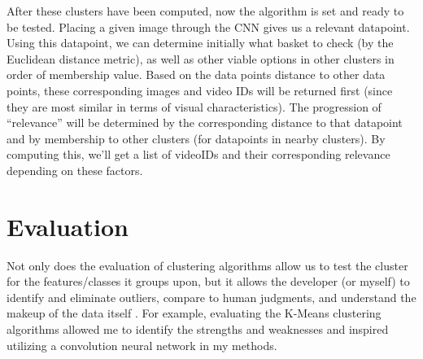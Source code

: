 \documentclass[10pt,twocolumn]{article}
\begin{document}
	

After these clusters have been computed, now the algorithm is set and ready to be tested. Placing a given image through the CNN gives us a relevant datapoint. Using this datapoint, we can determine initially what basket to check (by the Euclidean distance metric), as well as other viable options in other clusters in order of membership value. Based on the data points distance to other data points, these corresponding images and video IDs will be returned first (since they are most similar in terms of visual characteristics). The progression of “relevance” will be determined by the corresponding distance to that datapoint and by membership to other clusters (for datapoints in nearby clusters). By computing this, we’ll get a list of videoIDs and their corresponding relevance depending on these factors. 

\section{Evaluation}

Not only does the evaluation of clustering algorithms allow us to test the cluster for the features/classes it groups upon, but it allows the developer (or myself) to identify and eliminate outliers, compare to human judgments, and understand the makeup of the data itself \cite{Lavrenko2014}. For example, evaluating the K-Means clustering algorithms allowed me to identify the strengths and weaknesses and inspired utilizing a convolution neural network in my methods.
\end{document}
